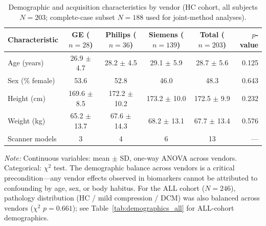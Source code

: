 \documentclass[12pt,a4paper]{article}
\begin{document}
\begin{table}[H]
\centering
\caption{Demographic and acquisition characteristics by vendor (HC cohort, all subjects $N=203$; complete-case subset $N=188$ used for joint-method analyses).}
\label{tab:demographics}
\begin{tabular}{lccccr}
\toprule
\textbf{Characteristic} & \textbf{GE ($n=28$)} & \textbf{Philips ($n=36$)} & \textbf{Siemens ($n=139$)} & \textbf{Total ($n=203$)} & \textbf{$p$-value} \\
\midrule
Age (years)       & 26.9 $\pm$ 4.7 & 28.2 $\pm$ 4.5 & 29.1 $\pm$ 5.9 & 28.7 $\pm$ 5.6  & 0.125 \\
Sex (\% female)    & 53.6           & 52.8           & 46.0           & 48.3             & 0.643 \\
Height (cm)        & 169.6 $\pm$ 8.5 & 172.2 $\pm$ 10.2 & 173.2 $\pm$ 10.0 & 172.5 $\pm$ 9.9  & 0.232 \\
Weight (kg)        & 65.2 $\pm$ 13.7 & 67.6 $\pm$ 14.3 & 68.2 $\pm$ 13.1 & 67.7 $\pm$ 13.4  & 0.576 \\
Scanner models     & 3              & 4              & 6              & 13               & --- \\
\bottomrule
\end{tabular}
\vspace{4pt}
\par\small\textit{Note:} Continuous variables: mean $\pm$ SD, one-way ANOVA across vendors. Categorical: $\chi^2$ test. The demographic balance across vendors is a critical precondition---any vendor effects observed in biomarkers cannot be attributed to confounding by age, sex, or body habitus. For the ALL cohort ($N=246$), pathology distribution (HC / mild compression / DCM) was also balanced across vendors ($\chi^2$ $p = 0.661$); see Table~\ref{tab:demographics_all} for ALL-cohort demographics.
\end{table}
\end{document}
